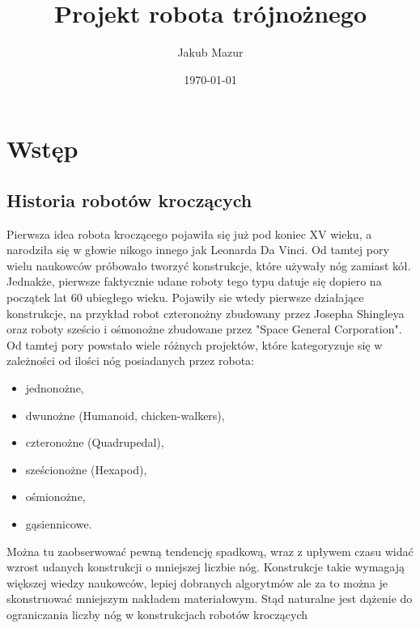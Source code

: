 \documentclass[a4paper,13pt]{article}
\title{Projekt robota trójnożnego}
\author{Jakub Mazur}
\date{\today}
\begin{document}


\maketitle

\hypersetup{
	linktocpage=true,
    colorlinks=true,
    urlcolor=red,
    linktoc=all,
    linkcolor=blue,
}
\tableofcontents

\section{Wstęp}
\subsection{Historia robotów kroczących}
Pierwsza idea robota kroczącego pojawiła się już pod koniec XV wieku, a narodziła się w głowie nikogo innego jak Leonarda Da Vinci. Od tamtej pory wielu naukowców próbowało tworzyć konstrukcje, które używały nóg zamiast kół. Jednakże, pierwsze faktycznie udane roboty tego typu datuje się dopiero na początek lat 60 ubiegłego wieku. Pojawiły sie wtedy pierwsze działające konstrukcje, na przykład robot czteronożny zbudowany przez Josepha Shingleya oraz roboty sześcio i ośmonożne zbudowane przez "Space General Corporation". \cite{history}\\

Od tamtej pory powstało wiele różnych projektów, które kategoryzuje się w zależności od ilości nóg posiadanych przez robota:
\begin{itemize}
	\item jednonożne,
	\item dwunożne (Humanoid, chicken-walkers),
	\item czteronożne (Quadrupedal),
	\item sześcionożne (Hexapod),
	\item ośmionożne,
	\item gąsiennicowe.
\end{itemize}

Można tu zaobserwować pewną tendencję spadkową, wraz z upływem czasu widać wzrost udanych konstrukcji o mniejszej liczbie nóg. Konstrukcje takie wymagają większej wiedzy naukowców, lepiej dobranych algorytmów ale za to można je skonstruować mniejszym nakładem materiałowym. Stąd naturalne jest dążenie do ograniczania liczby nóg w konstrukcjach robotów kroczących\\
\end{document}
